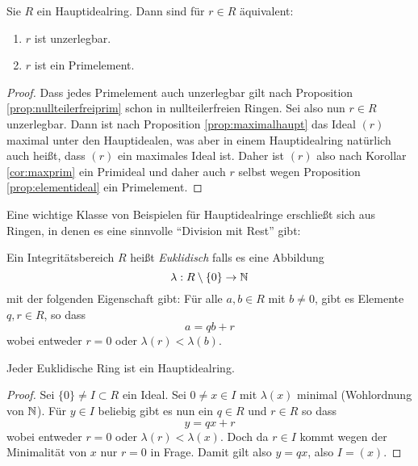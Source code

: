 \documentclass{book}
\begin{document}
\begin{prop}
    \label{prop:hauptirred}
    Sie $R$ ein Hauptidealring. Dann sind für $r \in R$ äquivalent:
    \begin{enumerate}[label=(\roman *)]
        \item $r$ ist unzerlegbar. 
        \item $r$ ist ein Primelement. 
    \end{enumerate}
\end{prop}
\begin{proof}
    Dass jedes Primelement auch unzerlegbar gilt nach Proposition
    \ref{prop:nullteilerfreiprim} schon in nullteilerfreien Ringen. Sei also
    nun $r \in R$ unzerlegbar. Dann ist nach Proposition
    \ref{prop:maximalhaupt} das Ideal $(r)$ maximal unter den Hauptidealen, was
    aber in einem Hauptidealring natürlich auch heißt, dass $(r)$ ein maximales
    Ideal ist. Daher ist $(r)$ also nach Korollar \ref{cor:maxprim} ein
    Primideal und daher auch $r$ selbst wegen Proposition
    \ref{prop:elementideal} ein Primelement.
\end{proof}

Eine wichtige Klasse von Beispielen für Hauptidealringe erschließt sich aus
Ringen, in denen es eine sinnvolle ``Division mit Rest'' gibt:

\begin{defi}
    \label{defi:euklid}
    Ein Integritätsbereich $R$ heißt \emph{Euklidisch} falls es eine Abbildung 
    \[
        \lambda: R \setminus \{0\} \to \mathbb{N}
    \] 
    mit der folgenden Eigenschaft gibt: Für alle $a,b \in R$ mit $b \neq 0$,
    gibt es Elemente $q,r \in R$, so dass
    \[
        a = qb + r
    \]
    wobei entweder $r = 0$ oder $\lambda(r) < \lambda(b)$. 
\end{defi}

\begin{thm}
    \label{thm:euklidhaupt}
    Jeder Euklidische Ring ist ein Hauptidealring.
\end{thm}
\begin{proof}
    Sei $\{0\} \neq I \subset R$ ein Ideal. Sei $0 \neq x \in I$ mit $\lambda(x)$ minimal
    (Wohlordnung von $\mathbb{N}$). Für $y \in I$ beliebig gibt es nun ein $q \in R$ und $r \in R$ so dass
    \[
        y = qx + r
    \]
    wobei entweder $r = 0$ oder $\lambda(r) < \lambda(x)$. Doch da $r \in I$
    kommt wegen der Minimalität von $x$ nur $r=0$ in Frage. Damit gilt also $y
    = qx$, also $I = (x)$. 
\end{proof}
\end{document}
